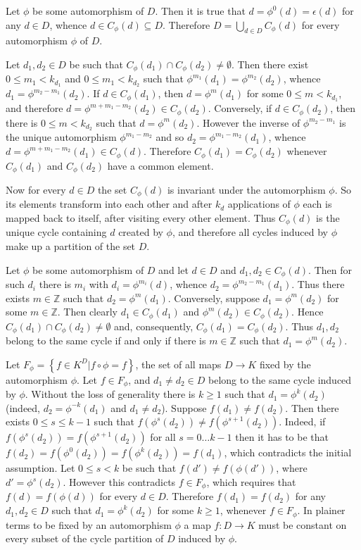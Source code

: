 \documentclass[a4paper]{article}
\newcommand{\obj}[1]{\left\{{#1}\right\}}
\begin{document}
Let $\phi$ be some automorphism of $D$. Then it is true that $d=\phi^0(d)=\epsilon(d)$ for any $d\in D$, whence $d\in C_\phi(d)\subseteq D$. Therefore $D = \bigcup_{d\in D}C_\phi(d)$ for every automorphism $\phi$ of $D$.

Let $d_1, d_2\in D$ be such that $C_\phi(d_1)\cap C_\phi(d_2)\neq \emptyset$. Then there exist $0\leq m_1 < k_{d_1}$ and $0\leq m_1 < k_{d_2}$ such that $\phi^{m_1}(d_1) = \phi^{m_2}(d_2)$, whence $d_1=\phi^{m_2-m_1}(d_2)$.
If $d\in C_\phi(d_1)$, then $d=\phi^m(d_1)$ for some $0\leq m < k_{d_1}$, and therefore $d=\phi^{m+m_1-m_2}(d_2)\in C_\phi(d_2)$. Conversely, if $d\in C_\phi(d_2)$, then there is $0\leq m < k_{d_2}$ such that $d=\phi^m(d_2)$. However the inverse of $\phi^{m_2-m_1}$ is the unique automorphism $\phi^{m_1-m_2}$ and so $d_2 = \phi^{m_1-m_2}(d_1)$, whence $d = \phi^{m+m_1-m_2}(d_1) \in C_\phi(d)$. Therefore $C_\phi(d_1) = C_\phi(d_2)$ whenever $C_\phi(d_1)$ and $C_\phi(d_2)$ have a common element.

Now for every $d\in D$ the set $C_\phi(d)$ is invariant under the automorphism $\phi$. So its elements transform into each other and after $k_d$ applications of $\phi$ each is mapped back to itself, after visiting every other element. Thus $C_\phi(d)$ is the unique cycle containing $d$ created by $\phi$, and therefore all cycles induced by $\phi$ make up a partition of the set $D$.

Let $\phi$ be some automorphism of $D$ and let $d\in D$ and $d_1, d_2\in C_\phi(d)$. Then for such $d_i$ there is $m_i$ with $d_i = \phi^{m_i}(d)$, whence $d_2 = \phi^{m_2-m_1}(d_1)$. Thus there exists $m\in \mathbb{Z}$ such that $d_2=\phi^m(d_1)$. Conversely, suppose $d_1=\phi^m(d_2)$ for some $m\in \mathbb{Z}$. Then clearly $d_1\in C_\phi(d_1)$ and $\phi^m(d_2)\in C_\phi(d_2)$. Hence $C_\phi(d_1)\cap C_\phi(d_2)\neq \emptyset$ and, consequently, $C_\phi(d_1)=C_\phi(d_2)$. Thus $d_1, d_2$ belong to the same cycle if and only if there is $m\in \mathbb{Z}$ such that $d_1 = \phi^m(d_2)$.

Let $F_\phi = \obj{f\in K^D\vert f\circ \phi = f}$, the set of all maps $D\to K$ fixed by the automorphism $\phi$. Let $f\in F_\phi$, and $d_1\neq d_2\in D$ belong to the same cycle induced by $\phi$. Without the loss of generality there is $k\geq 1$ such that $d_1 = \phi^k(d_2)$ (indeed, $d_2 = \phi^{-k}(d_1)$ and $d_1\neq d_2$).
Suppose $f(d_1)\neq f(d_2)$. Then there exists $0\leq s\leq k-1$ such that $f(\phi^s(d_2))\neq f(\phi^{s+1}(d_2))$. Indeed, if $f(\phi^s(d_2)) = f(\phi^{s+1}(d_2))$ for all $s=0\ldots k-1$ then it has to be that $f(d_2) = f(\phi^0(d_2)) = f(\phi^k(d_2)) = f(d_1)$, which contradicts the initial assumption. Let $0\leq s<k$ be such that $f(d')\neq f(\phi(d'))$, where $d'=\phi^s(d_2)$. However this contradicts $f\in F_\phi$, which requires that $f(d) = f(\phi(d))$ for every $d\in D$. Therefore $f(d_1)=f(d_2)$ for any $d_1, d_2\in D$ such that $d_1 = \phi^k(d_2)$ for some $k\geq 1$, whenever $f\in F_\phi$. In plainer terms to be fixed by an automorphism $\phi$ a map $f:D\to K$ must be constant on every subset of the cycle partition of $D$ induced by $\phi$.
\end{document}
